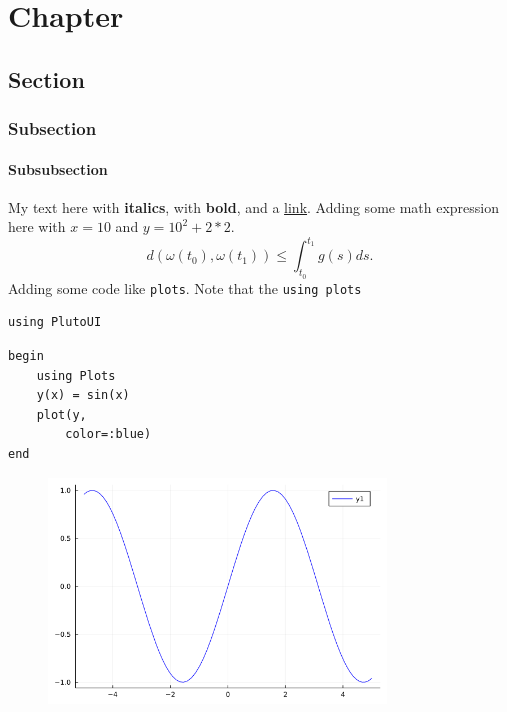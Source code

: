 \newpage

\chapter{Chapter}

\section{Section}

\subsection{Subsection}

\subsubsection{Subsubsection}
My text here with \textbf{italics}, with \textbf{bold}, and a \href{https://davibarreira.github.io/}{link}.  Adding some math expression here with  $x=10$ and  $y = 10^2 + 2*2$. 
\begin{displaymath}
	d(\omega(t_0),\omega(t_1)) \leq \int^{t_1}_{t_0}g(s) ds.
\end{displaymath}
 Adding some code like  \lstinline[style=julia]{plots}. Note that the  \lstinline[style=julia]{using plots}  
\begin{lstlisting}[language=JuliaLocal, style=julia]
using PlutoUI
\end{lstlisting}

\begin{lstlisting}[language=JuliaLocal, style=julia]
begin
	using Plots
	y(x) = sin(x)
	plot(y,
		color=:blue)
end
\end{lstlisting}

\begin{figure}[H]
	\centering
	\includegraphics[width=0.8\textwidth]{./figures/examplepluto_figure1.png}
	\label{fig:examplepluto_figure1.png}

\end{figure}

